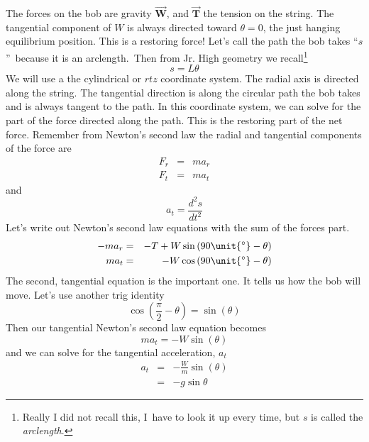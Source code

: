 \documentclass{book}
\begin{document}
The forces on the bob are gravity $\overrightarrow{\mathbf{W}}$, and $%
\overrightarrow{\mathbf{T}}$ the tension on the string. The tangential
component of $W$ is always directed toward $\theta =0$, the just hanging
equilibrium position. This is a restoring force! Let's call the path the bob
takes \textquotedblleft $s$\textquotedblright\ because it is an arclength.\
Then from Jr. High geometry we recall\footnote{%
Really I did not recall this, I\ have to look it up every time, but $s$ is
called the \emph{arclength}.}%
\begin{equation}
s=L\theta
\end{equation}%
We will use a the cylindrical or $rtz$ coordinate system. The radial axis is
directed along the string. The tangential direction is along the circular
path the bob takes and is always tangent to the path. In this coordinate
system, we can solve for the part of the force directed along the path. This
is the restoring part of the net force. Remember from Newton's second law
the radial and tangential components of the force are 
\begin{eqnarray*}
F_{r} &=&ma_{r} \\
F_{t} &=&ma_{t}
\end{eqnarray*}%
and 
\begin{equation*}
a_{t}=\frac{d^{2}s}{dt^{2}}
\end{equation*}%
Let's write out Newton's second law equations with the sum of the forces
part.%
\begin{eqnarray*}
-ma_{r} &=&-T+W\sin \left( 90\unit{%
{{}^\circ}%
}-\theta \right) \\
ma_{t} &=&-W\cos \left( 90\unit{%
{{}^\circ}%
}-\theta \right)
\end{eqnarray*}%
The second, tangential equation is the important one. It tells us how the
bob will move. Let's use another trig identity 
\begin{equation*}
\cos \left( \frac{\pi }{2}-\theta \right) =\sin \left( \theta \right)
\end{equation*}%
Then our tangential Newton's second law equation becomes%
\begin{equation*}
ma_{t}=-W\sin \left( \theta \right)
\end{equation*}%
and we can solve for the tangential acceleration, $a_{t}$ 
\begin{eqnarray*}
a_{t} &=&-\frac{W}{m}\sin \left( \theta \right) \\
&=&-g\sin \theta
\end{eqnarray*}
\end{document}
